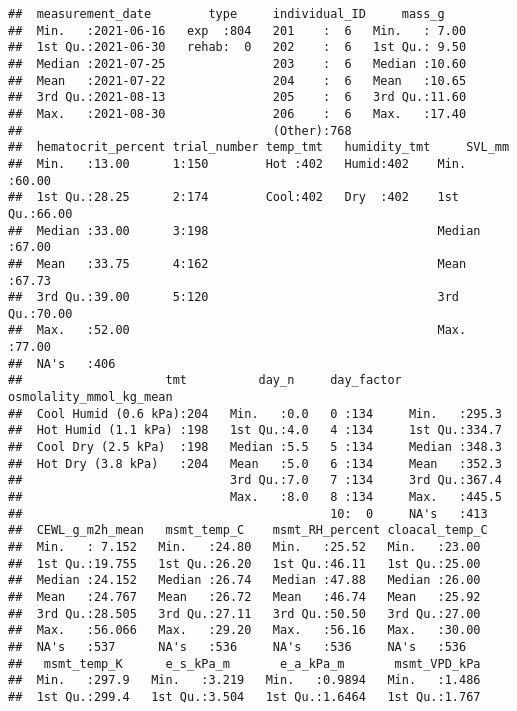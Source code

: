 \documentclass[
]{article}
\begin{document}
\begin{verbatim}
##  measurement_date        type     individual_ID     mass_g     
##  Min.   :2021-06-16   exp  :804   201    :  6   Min.   : 7.00  
##  1st Qu.:2021-06-30   rehab:  0   202    :  6   1st Qu.: 9.50  
##  Median :2021-07-25               203    :  6   Median :10.60  
##  Mean   :2021-07-22               204    :  6   Mean   :10.65  
##  3rd Qu.:2021-08-13               205    :  6   3rd Qu.:11.60  
##  Max.   :2021-08-30               206    :  6   Max.   :17.40  
##                                   (Other):768                  
##  hematocrit_percent trial_number temp_tmt   humidity_tmt     SVL_mm     
##  Min.   :13.00      1:150        Hot :402   Humid:402    Min.   :60.00  
##  1st Qu.:28.25      2:174        Cool:402   Dry  :402    1st Qu.:66.00  
##  Median :33.00      3:198                                Median :67.00  
##  Mean   :33.75      4:162                                Mean   :67.73  
##  3rd Qu.:39.00      5:120                                3rd Qu.:70.00  
##  Max.   :52.00                                           Max.   :77.00  
##  NA's   :406                                                            
##                    tmt          day_n     day_factor osmolality_mmol_kg_mean
##  Cool Humid (0.6 kPa):204   Min.   :0.0   0 :134     Min.   :295.3          
##  Hot Humid (1.1 kPa) :198   1st Qu.:4.0   4 :134     1st Qu.:334.7          
##  Cool Dry (2.5 kPa)  :198   Median :5.5   5 :134     Median :348.3          
##  Hot Dry (3.8 kPa)   :204   Mean   :5.0   6 :134     Mean   :352.3          
##                             3rd Qu.:7.0   7 :134     3rd Qu.:367.4          
##                             Max.   :8.0   8 :134     Max.   :445.5          
##                                           10:  0     NA's   :413            
##  CEWL_g_m2h_mean   msmt_temp_C    msmt_RH_percent cloacal_temp_C 
##  Min.   : 7.152   Min.   :24.80   Min.   :25.52   Min.   :23.00  
##  1st Qu.:19.755   1st Qu.:26.20   1st Qu.:46.11   1st Qu.:25.00  
##  Median :24.152   Median :26.74   Median :47.88   Median :26.00  
##  Mean   :24.767   Mean   :26.72   Mean   :46.74   Mean   :25.92  
##  3rd Qu.:28.505   3rd Qu.:27.11   3rd Qu.:50.50   3rd Qu.:27.00  
##  Max.   :56.066   Max.   :29.20   Max.   :56.16   Max.   :30.00  
##  NA's   :537      NA's   :536     NA's   :536     NA's   :536    
##   msmt_temp_K      e_s_kPa_m       e_a_kPa_m       msmt_VPD_kPa  
##  Min.   :297.9   Min.   :3.219   Min.   :0.9894   Min.   :1.486  
##  1st Qu.:299.4   1st Qu.:3.504   1st Qu.:1.6464   1st Qu.:1.767  

\end{verbatim}
\end{document}
